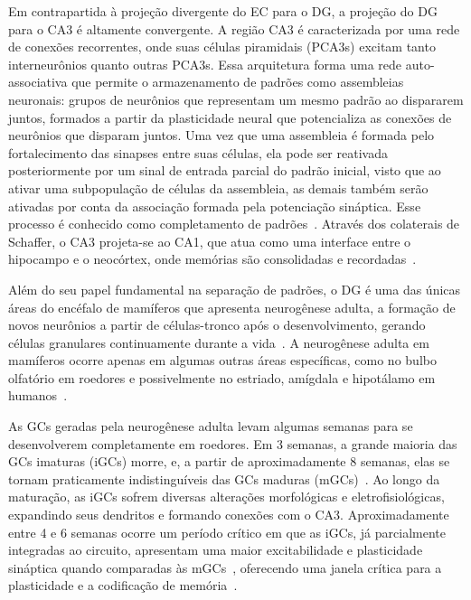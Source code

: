Em contrapartida à projeção divergente do EC para o DG, a projeção do DG para o CA3 é altamente convergente. A região CA3 é
caracterizada por uma rede de conexões recorrentes, onde suas células piramidais (PCA3s) excitam tanto interneurônios quanto
outras PCA3s. Essa arquitetura forma uma rede auto-associativa que permite o armazenamento de padrões como assembleias neuronais:
grupos de neurônios que representam um mesmo padrão ao dispararem juntos, formados a partir da plasticidade neural que
potencializa as conexões de neurônios que disparam juntos. Uma vez que uma assembleia é formada pelo fortalecimento das sinapses
entre suas células, ela pode ser reativada posteriormente por um sinal de entrada parcial do padrão inicial, visto que ao ativar
uma subpopulação de células da assembleia, as demais também serão ativadas por conta da associação formada pela potenciação
sináptica. Esse processo é conhecido como completamento de padrões~\cite{kopsickFormation2024, leduigouRecurrent2014}. Através dos
colaterais de Schaffer, o CA3 projeta-se ao CA1, que atua como uma interface entre o hipocampo e o neocórtex, onde memórias são
consolidadas e recordadas~\cite{bartschCA12011}.

Além do seu papel fundamental na separação de padrões, o DG é uma das únicas áreas do encéfalo de mamíferos que apresenta
neurogênese adulta, a formação de novos neurônios a partir de células-tronco após o desenvolvimento, gerando células granulares
continuamente durante a vida~\cite{boldriniHuman2018, dumitruIdentification2025}. A neurogênese adulta em mamíferos ocorre apenas
em algumas outras áreas específicas, como no bulbo olfatório em roedores e possivelmente no estriado, amígdala e hipotálamo em
humanos~\cite{alonsoImpact2024, jurkowskiHippocampus2020}.

As GCs geradas pela neurogênese adulta levam algumas semanas para se desenvolverem completamente em roedores. Em 3 semanas, a
grande maioria das GCs imaturas (iGCs) morre, e, a partir de aproximadamente 8 semanas, elas se tornam praticamente
indistinguíveis das GCs maduras (mGCs)~\cite{denoth-lippunerFormation2021}. Ao longo da maturação, as iGCs sofrem diversas
alterações morfológicas e eletrofisiológicas, expandindo seus dendritos e formando conexões com o CA3. Aproximadamente entre 4 e 6
semanas ocorre um período crítico em que as iGCs, já parcialmente integradas ao circuito, apresentam uma maior excitabilidade e
plasticidade sináptica quando comparadas às mGCs~\cite{zhaoDistinct2006,denoth-lippunerFormation2021, aimoneRegulation2014},
oferecendo uma janela crítica para a plasticidade e a codificação de memória~\cite{berdugo-vegaSharpening2023}.

